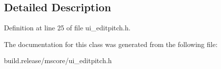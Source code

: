 \subsection{Detailed Description}


Definition at line 25 of file ui\+\_\+editpitch.\+h.



The documentation for this class was generated from the following file\+:\begin{DoxyCompactItemize}
\item 
build.\+release/mscore/ui\+\_\+editpitch.\+h\end{DoxyCompactItemize}
